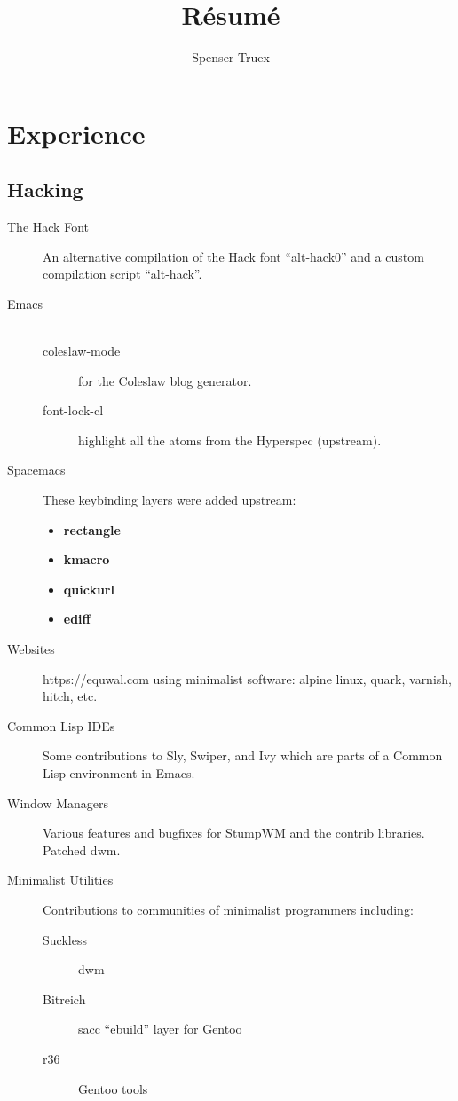 


\title{R\'esum\'e}
\author{Spenser Truex}

\maketitle

\section{Experience}
\subsection{Hacking}
\begin{description}
    \item [The Hack Font]{An alternative compilation of the Hack font ``alt-hack0'' and a custom compilation script ``alt-hack''.}

    \item [Emacs] {
        \begin{description}
            \item[\\] {} %
            \item [coleslaw-mode] {for the Coleslaw blog generator.}
            \item [font-lock-cl] {highlight all the atoms from the Hyperspec (upstream).}
        \end{description}
}
\item [Spacemacs]{{These keybinding layers were added upstream:}
    \begin{itemize}[\\]
        \item{\bfseries rectangle}
        \item{\bfseries kmacro}
        \item{\bfseries quickurl}
        \item{\bfseries ediff}
    \end{itemize}
}


\item [Websites] {https://equwal.com using minimalist software: alpine linux, quark, varnish, hitch, etc.}
\item [Common Lisp IDEs] {Some contributions to Sly, Swiper, and Ivy which are parts of a Common Lisp environment in Emacs.}
\item [Window Managers] {Various features and bugfixes for StumpWM and the contrib libraries. Patched dwm.}
\item [Minimalist Utilities] {Contributions to communities of minimalist programmers including:}
    \begin{description}
        \item[Suckless]{dwm}
        \item[Bitreich]{sacc ``ebuild'' layer for Gentoo}
        \item[r36]{Gentoo tools}
    \end{description}
\end{description}
